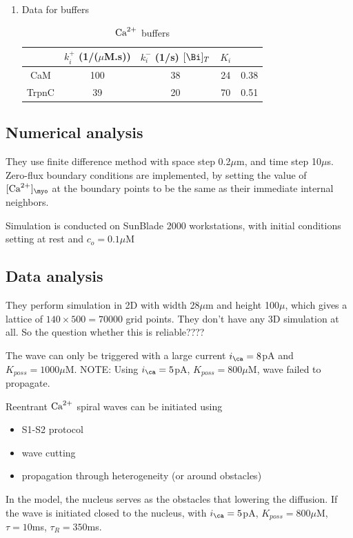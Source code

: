 \begin{enumerate}
\item Data for buffers
\begin{table}[hbt]
\begin{center}
\caption{${\text{Ca}^{2+}}$ buffers}
\begin{tabular}{ccccc} 
  \hline
  & $k^+_i$ (1/($\mu$M.s))& $k^-_i$ (1/s) $[\Bi]_T$ & $K_i$ \\ 
  \hline\hline
  CaM & 100 & 38 & 24 & 0.38 \\
  TrpnC & 39 & 20 & 70 & 0.51
\end{tabular}
\end{center}
\label{tab:Li2007_buffers}
\end{table}

\end{enumerate}

\subsection{Numerical analysis}
\label{sec:numerical-analysis-3}

They use finite difference method with space step 0.2$\mu$m, and time
step 10$\mu$s. Zero-flux boundary conditions are implemented, by
setting the value of $[\Ca]_\myo$ at the boundary points to be the
same as their immediate internal neighbors.

Simulation is conducted on SunBlade 2000 workstations, with initial
conditions setting at rest and $c_o=0.1\mu$M

\subsection{Data analysis}
\label{sec:data-analysis-5}

They perform simulation in 2D with width 28$\mu$m and height 100$\mu$,
which gives a lattice of $140\times500=70000$ grid points. They don't
have any 3D simulation at all. So the question whether this is
reliable????

The wave can only be triggered with a large current $i_\ca=8$pA and
$K_{poss}=1000\mu$M. NOTE: Using $i_\ca=5$pA, $K_{poss}=800\mu$M, wave
failed to propagate. 


 Reentrant ${\text{Ca}^{2+}}$ spiral waves can be initiated using
 \begin{itemize}
 \item S1-S2 protocol
 \item wave cutting
 \item propagation through heterogeneity (or around obstacles)
 \end{itemize}
In the model, the nucleus serves as the obstacles that lowering the
diffusion. If the wave is initiated closed to the nucleus, with
$i_\ca=5$pA, $K_{poss}=800\mu$M, $\tau=10$ms, $\tau_R=350$ms.

